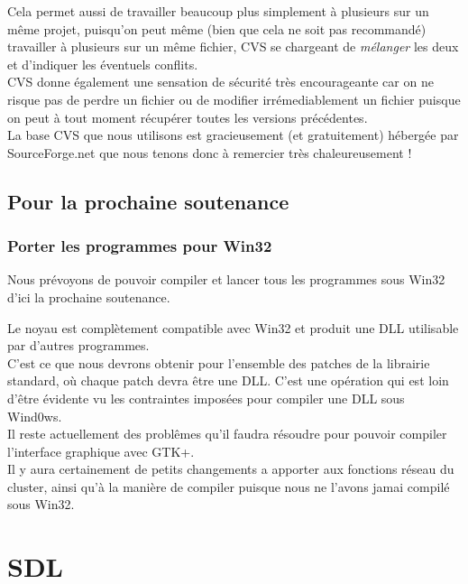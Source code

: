\documentclass[14pt,a4paper]{report}
\begin{document}
Cela permet aussi de travailler beaucoup plus simplement \`a plusieurs
sur un m\^eme projet, puisqu'on peut m\^eme (bien que cela ne soit pas
recommand\'e) travailler \`a plusieurs sur un m\^eme fichier, CVS se
chargeant de {\it m\'elanger } les deux et d'indiquer les \'eventuels
conflits.\\

CVS donne \'egalement une sensation de s\'ecurit\'e tr\`es encourageante
car on ne risque pas de perdre un fichier ou de modifier irr\'emediablement
un fichier puisque on peut \`a tout moment r\'ecup\'erer toutes les versions
 pr\'ec\'edentes. \\

La base CVS que nous utilisons est gracieusement
(et gratuitement) h\'eberg\'ee par SourceForge.net
que nous tenons donc \`a remercier tr\`es chaleureusement ! \\


\section{Pour la prochaine soutenance}

\subsection {Porter les programmes pour Win32}
Nous pr\'evoyons de pouvoir compiler et lancer tous les programmes
sous Win32 d'ici la prochaine soutenance.

Le noyau est compl\`etement compatible avec Win32 et produit une DLL
utilisable par d'autres programmes. \\

C'est ce que nous devrons obtenir pour l'ensemble des patches de la
librairie standard, o\`u chaque patch devra \^etre une DLL.
C'est une op\'eration qui est loin d'\^etre \'evidente vu les contraintes
impos\'ees pour compiler une DLL sous Wind0ws. \\

Il reste actuellement des probl\^emes qu'il faudra r\'esoudre
pour pouvoir compiler l'interface graphique avec GTK+. \\

Il y aura certainement de petits changements a apporter aux
fonctions r\'eseau du cluster, ainsi qu'\`a la mani\`ere de compiler
puisque nous ne l'avons jamai compil\'e sous Win32. \\

\chapter{SDL}
\end{document}
